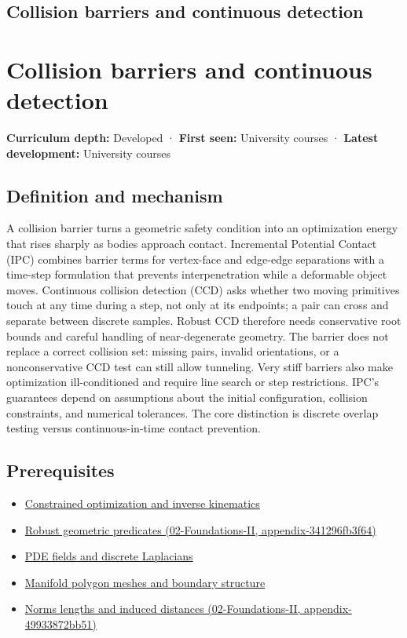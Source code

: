 \hypertarget{appendix-a9ba01fa72a6}{}
\section*{Collision barriers and continuous detection}
\chapter{Collision barriers and continuous detection}\label{appendix-a9ba01fa72a6-collision-barriers-and-continuous-detection}

\textbf{Curriculum depth:} Developed · \textbf{First seen:} University courses · \textbf{Latest development:} University courses

\section{Definition and mechanism}\label{appendix-a9ba01fa72a6-definition-and-mechanism}

A collision barrier turns a geometric safety condition into an optimization energy that rises sharply as bodies approach contact. Incremental Potential Contact (IPC) combines barrier terms for vertex-face and edge-edge separations with a time-step formulation that prevents interpenetration while a deformable object moves. Continuous collision detection (CCD) asks whether two moving primitives touch at any time during a step, not only at its endpoints; a pair can cross and separate between discrete samples. Robust CCD therefore needs conservative root bounds and careful handling of near-degenerate geometry. The barrier does not replace a correct collision set: missing pairs, invalid orientations, or a nonconservative CCD test can still allow tunneling. Very stiff barriers also make optimization ill-conditioned and require line search or step restrictions. IPC's guarantees depend on assumptions about the initial configuration, collision constraints, and numerical tolerances. The core distinction is discrete overlap testing versus continuous-in-time contact prevention.

\section{Prerequisites}\label{appendix-a9ba01fa72a6-prerequisites}

\begin{itemize}
\tightlist
\item
  \hyperref[appendix-29f4bea4c2bb]{Constrained optimization and inverse kinematics}
\item
  \href{../02-Foundations-II/main.pdf\#nameddest=appendix-341296fb3f64}{Robust geometric predicates (02-Foundations-II, appendix-341296fb3f64)}
\item
  \hyperref[appendix-1988d465c119]{PDE fields and discrete Laplacians}
\item
  \hyperref[appendix-fab348609369]{Manifold polygon meshes and boundary structure}
\item
  \href{../02-Foundations-II/main.pdf\#nameddest=appendix-49933872bb51}{Norms lengths and induced distances (02-Foundations-II, appendix-49933872bb51)}
\end{itemize}

